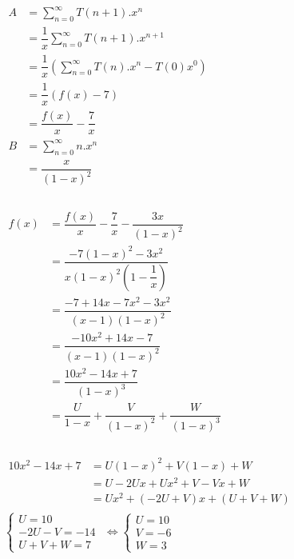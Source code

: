 \documentclass[12pt, letterpaper]{article}
\begin{document}
\begin{enumerate}
    \\
    $\begin{aligned}   
          A &=\sum_{n = 0}^{\infty}T(n+1).x^n\\
            &=\dfrac{1}{x}\sum_{n = 0}^{\infty}T(n+1).x^{n+1}\\
            &=\dfrac{1}{x}(\sum_{n=0}^{\infty}T(n).x^{n} - T(0)x^0)\\
            &=\dfrac{1}{x}(f(x)-7)\\
            &=\dfrac{f(x)}{x} - \dfrac{7}{x}\\
          B &=\sum_{n = 0}^{\infty}n.x^n\\
          &=\dfrac{x}{(1-x)^2} \\
    \end{aligned}$\\

    \\
    $\begin{aligned}   
        f(x) &=\dfrac{f(x)}{x} - \dfrac{7}{x}- \dfrac{3x}{(1-x)^2}\\
            &= \dfrac{-7(1-x)^2-3x^2}{x(1-x)^2(1-\dfrac{1}{x})}\\
            &= \dfrac{-7 + 14x - 7x^2 - 3x^2}{(x-1)(1-x)^2}\\
            &= \dfrac{-10x^2+14x-7}{(x-1)(1-x)^2}\\
            &= \dfrac{10x^2-14x+7}{(1-x)^3}\\
            &= \dfrac{U}{1-x}+\dfrac{V}{(1-x)^2}+\dfrac{W}{(1-x)^3}\\
    \end{aligned}$\\
    
     \\
    $\begin{aligned}   
        10x^2-14x+7 &= U(1-x)^2 + V(1-x) + W\\
            &= U - 2Ux + Ux^2 + V - Vx + W\\
            &= Ux^2 + (-2U+V)x + (U+V+W)\\
    \end{aligned}$\\
    $\begin{cases}
        U = 10\\
        -2U - V = -14\\
        U + V + W = 7
    \end{cases}$
    $\Leftrightarrow \begin{cases}
        U = 10\\
        V = -6\\
        W = 3
    \end{cases}$\\


\end{enumerate}
\end{document}
